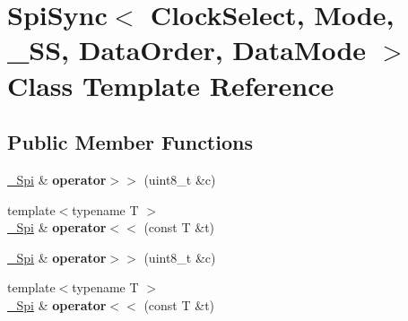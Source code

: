 \hypertarget{classSpiSync}{}\section{Spi\+Sync$<$ Clock\+Select, Mode, \+\_\+\+SS, Data\+Order, Data\+Mode $>$ Class Template Reference}
\label{classSpiSync}
\subsection*{Public Member Functions}
\begin{DoxyCompactItemize}
\item 
\hyperlink{classSpiSync}{\+\_\+\+Spi} \& {\bfseries operator$>$$>$} (uint8\+\_\+t \&c)\hypertarget{classSpiSync_a33585d15d7e75a24d7f31e832f719542}{}\label{classSpiSync_a33585d15d7e75a24d7f31e832f719542}

\item 
{\footnotesize template$<$typename T $>$ }\\\hyperlink{classSpiSync}{\+\_\+\+Spi} \& {\bfseries operator$<$$<$} (const T \&t)\hypertarget{classSpiSync_a04a99b76a571984344ee58ccd7510534}{}\label{classSpiSync_a04a99b76a571984344ee58ccd7510534}

\item 
\hyperlink{classSpiSync}{\+\_\+\+Spi} \& {\bfseries operator$>$$>$} (uint8\+\_\+t \&c)\hypertarget{classSpiSync_a33585d15d7e75a24d7f31e832f719542}{}\label{classSpiSync_a33585d15d7e75a24d7f31e832f719542}

\item 
{\footnotesize template$<$typename T $>$ }\\\hyperlink{classSpiSync}{\+\_\+\+Spi} \& {\bfseries operator$<$$<$} (const T \&t)\hypertarget{classSpiSync_a04a99b76a571984344ee58ccd7510534}{}\label{classSpiSync_a04a99b76a571984344ee58ccd7510534}

\end{DoxyCompactItemize}
